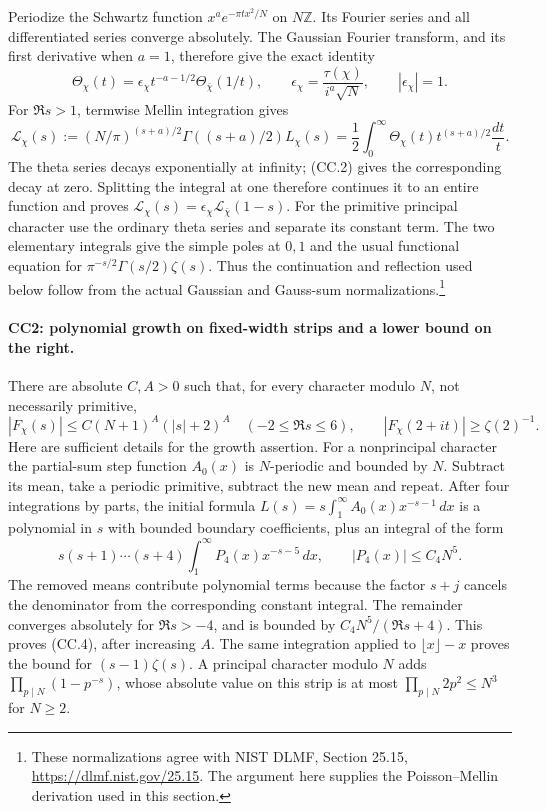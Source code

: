 Periodize the Schwartz function $x^a e^{-\pi t x^2/N}$ on $N\mathbb Z$.
Its Fourier series and all differentiated series converge absolutely.
The Gaussian Fourier transform, and its first derivative when $a=1$,
therefore give the exact identity
\[
 \Theta_\chi(t)=\epsilon_\chi t^{-a-1/2}\Theta_{\bar\chi}(1/t),
 \qquad \epsilon_\chi=\frac{\tau(\chi)}{i^a\sqrt N},
 \qquad |\epsilon_\chi|=1.                              \tag{CC.2}
\]
For $\Re s>1$, termwise Mellin integration gives
\[
 \mathcal L_\chi(s):=
 (N/\pi)^{(s+a)/2}\Gamma((s+a)/2)L_\chi(s)
 =\frac12\int_0^\infty\Theta_\chi(t)t^{(s+a)/2}\frac{dt}{t}.
                                                               \tag{CC.3}
\]
The theta series decays exponentially at infinity; (CC.2) gives
the corresponding decay at zero. Splitting the integral at one
therefore continues it to an entire function and proves
$\mathcal L_\chi(s)=\epsilon_\chi\mathcal L_{\bar\chi}(1-s)$.
For the primitive principal character use the ordinary theta series
and separate its constant term. The two elementary integrals give
the simple poles at $0,1$ and the usual functional equation for
$\pi^{-s/2}\Gamma(s/2)\zeta(s)$.
Thus the continuation and reflection used below follow from the
actual Gaussian and Gauss-sum normalizations.\footnote{These
normalizations agree with NIST DLMF, Section 25.15,
\url{https://dlmf.nist.gov/25.15}. The argument here supplies the
Poisson--Mellin derivation used in this section.}

\paragraph{CC2: polynomial growth on fixed-width strips and a lower bound on the right.}
There are absolute $C,A>0$ such that, for every character modulo
$N$, not necessarily primitive,
\[
 |F_\chi(s)|\le C(N+1)^A(|s|+2)^A
                         \quad(-2\le\Re s\le6),\qquad
 |F_\chi(2+it)|\ge\zeta(2)^{-1}.                       \tag{CC.4}
\]
Here are sufficient details for the growth assertion. For a
nonprincipal character the partial-sum step function $A_0(x)$ is
$N$-periodic and bounded by $N$. Subtract its mean, take a
periodic primitive, subtract the new mean and repeat. After four
integrations by parts, the initial formula
$L(s)=s\int_1^\infty A_0(x)x^{-s-1}\,dx$ is a polynomial in $s$
with bounded boundary coefficients, plus an integral of the form
\[
 s(s+1)\cdots(s+4)\int_1^\infty P_4(x)x^{-s-5}\,dx,
                  \qquad |P_4(x)|\le C_4N^5.
\]
The removed means contribute polynomial terms because the factor
$s+j$ cancels the denominator from the corresponding constant
integral. The remainder converges absolutely for $\Re s>-4$,
and is bounded by $C_4N^5/(\Re s+4)$. This proves (CC.4), after
increasing $A$. The same integration applied to $\lfloor x\rfloor-x$
proves the bound for $(s-1)\zeta(s)$. A principal character modulo
$N$ adds $\prod_{p\mid N}(1-p^{-s})$, whose absolute value on this
strip is at most $\prod_{p\mid N}2p^2\le N^3$ for $N\ge2$.

